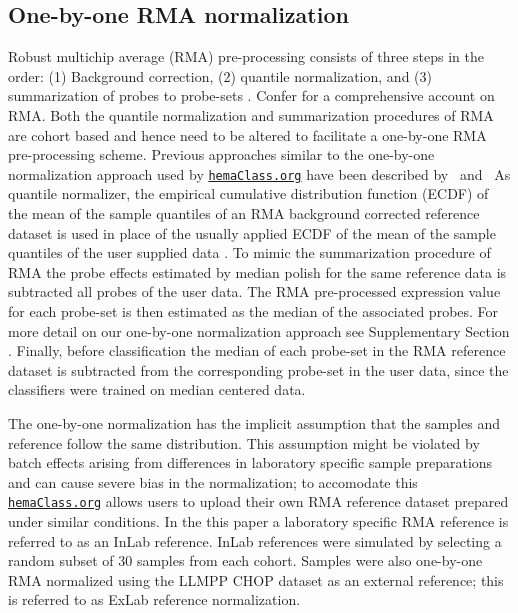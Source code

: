 \documentclass[10pt,letterpaper]{article}
\newcommand{\hemaClass}{\href{http://hemaClass.org}{\texttt{hemaClass.org}}}
\begin{document}



\subsection*{One-by-one RMA normalization}
Robust multichip average (RMA) pre-processing consists of three steps in the order:
(1) Background correction,
(2) quantile normalization, and
(3) summarization of probes to probe-sets \cite{Irizarry2003,Irizarry2003b}.
Confer \cite{Bolstad2004} for a comprehensive account on RMA.
Both the quantile normalization and summarization procedures of RMA are cohort based and hence need to be altered to facilitate a one-by-one RMA pre-processing scheme. Previous approaches similar to the one-by-one normalization approach used by \hemaClass{} have been described by \mbox{\cite{Katz2006} and \cite{McCall2010}}
As quantile normalizer, the empirical cumulative distribution function (ECDF) of the mean of the sample quantiles of an RMA background corrected reference dataset is used in place of the usually applied ECDF of the mean of the sample quantiles of the user supplied data \mbox{\cite{Bolstad2003}}.
To mimic the summarization procedure of RMA \mbox{\cite{Irizarry2003b}} the probe effects estimated by median polish for the same reference data is subtracted all probes of the user data.
The RMA pre-processed expression value for each probe-set is then estimated as the median of the associated probes. For more detail on our one-by-one normalization approach see Supplementary Section . Finally, before classification the median of each probe-set in the RMA reference dataset is subtracted from the corresponding probe-set in the user data, since the classifiers were trained on median centered data. 

The one-by-one normalization has the implicit assumption that the samples and reference follow the same distribution. This assumption might be violated by batch effects arising from differences in laboratory specific sample preparations and can cause severe bias in the normalization; to accomodate this \hemaClass{} allows users to upload their own RMA reference dataset prepared under similar conditions. In the this paper a laboratory specific RMA reference is referred to as an InLab reference. InLab references were simulated by selecting a random subset of 30 samples from each cohort. Samples were also one-by-one RMA normalized using the LLMPP CHOP dataset as an external reference; this is referred to as ExLab reference normalization.
\end{document}
